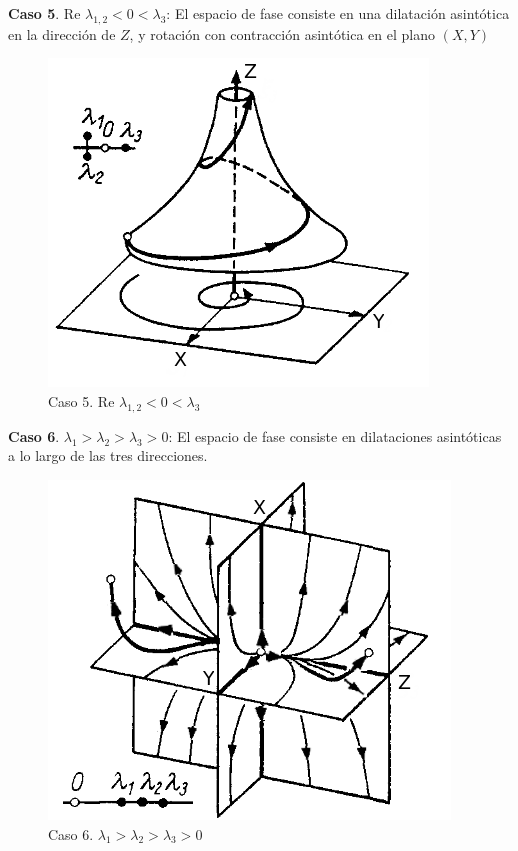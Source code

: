 \documentclass[a4paper,10pt]{article}
\begin{document}
\textbf{Caso 5}. Re $\lambda_{1,2} < 0 < \lambda_3$: El espacio de fase consiste en una dilatación asintótica
en la dirección de $Z$, y rotación con contracción asintótica en el plano $(X,Y)$

\begin{figure}[H]
 \centering
\includegraphics[scale=0.35]{problema3fig6}
\caption{Caso 5. Re $\lambda_{1,2} < 0 < \lambda_3$}
\label{fig:problema3fig6}
\end{figure}
\vspace{.3cm}

\textbf{Caso 6}. $\lambda_1 > \lambda_2 > \lambda_3 > 0$: El espacio de fase consiste en dilataciones asintóticas
a lo largo de las tres direcciones.

\begin{figure}[h]
 \centering
\includegraphics[scale=0.35]{problema3fig7}
\caption{Caso 6. $\lambda_1 > \lambda_2 > \lambda_3 > 0$}
\label{fig:problema3fig7}
\end{figure}
\vspace{.3cm}
\end{document}
